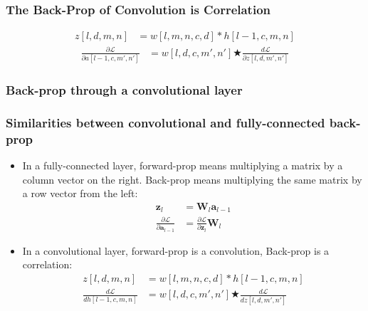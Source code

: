 \documentclass{beamer}
\begin{document}
\begin{frame}
  \frametitle{The Back-Prop of Convolution is Correlation}

  \begin{align*}
    z[l,d,m,n] &= w[l,m,n,c,d] \ast h[l-1,c,m,n]
  \end{align*}
  \begin{align*}
    \frac{\partial{\mathcal L}}{\partial a[l-1,c,m',n']}
    &= w[l,d,c,m',n'] \bigstar \frac{d{\mathcal L}}{\partial z[l,d,m',n']} 
  \end{align*}
\end{frame}


\begin{frame}
  \frametitle{Back-prop through a convolutional layer}

  \centerline{}
\end{frame}

\begin{frame}
  \frametitle{Similarities between convolutional and fully-connected back-prop}

  \begin{itemize}
  \item In a fully-connected layer, forward-prop means multiplying a
    matrix by a column vector on the right.  Back-prop means
    multiplying the same matrix by a row vector from the left:
    \begin{align*}
      \mathbf{z}_{l} &= \mathbf{W}_l\mathbf{a}_{l-1}\\
      \frac{\partial\mathcal{L}}{\partial\mathbf{a}_{l-1}}
      &= \frac{\partial\mathcal{L}}{\partial\mathbf{z}_{l}}\mathbf{W}_l
    \end{align*}
  \item In a convolutional layer, forward-prop is a convolution,
    Back-prop is a correlation:
    \begin{align*}
    z[l,d,m,n] &= w[l,m,n,c,d] \ast h[l-1,c,m,n]\\
    \frac{d{\mathcal L}}{dh[l-1,c,m,n]} &=
    w[l,d,c,m',n'] \bigstar \frac{d{\mathcal L}}{dz[l,d,m',n']}\\
    \end{align*}
  \end{itemize}
\end{frame}
    
\end{document}
